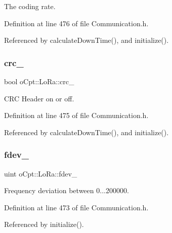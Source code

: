 The coding rate. 



Definition at line 476 of file Communication.\+h.



Referenced by calculate\+Down\+Time(), and initialize().

\hypertarget{classo_cpt_1_1_lo_ra_af6a4412b761252d2ef9b55c22ad2ef8e}{}\label{classo_cpt_1_1_lo_ra_af6a4412b761252d2ef9b55c22ad2ef8e} 
\subsubsection{\texorpdfstring{crc\+\_\+}{crc\_}}
{\footnotesize\ttfamily bool o\+Cpt\+::\+Lo\+Ra\+::crc\+\_\+\hspace{0.3cm}{\ttfamily [protected]}}



C\+RC Header on or off. 



Definition at line 475 of file Communication.\+h.



Referenced by calculate\+Down\+Time(), and initialize().

\hypertarget{classo_cpt_1_1_lo_ra_ac0a2434f4fd5275771f56c810aa3fbed}{}\label{classo_cpt_1_1_lo_ra_ac0a2434f4fd5275771f56c810aa3fbed} 
\subsubsection{\texorpdfstring{fdev\+\_\+}{fdev\_}}
{\footnotesize\ttfamily uint o\+Cpt\+::\+Lo\+Ra\+::fdev\+\_\+\hspace{0.3cm}{\ttfamily [protected]}}



Frequency deviation between 0...200000. 



Definition at line 473 of file Communication.\+h.



Referenced by initialize().

\hypertarget{classo_cpt_1_1_lo_ra_ab57a9c27d2f5744eaf07bdee11a24aba}{}\label{classo_cpt_1_1_lo_ra_ab57a9c27d2f5744eaf07bdee11a24aba} 
